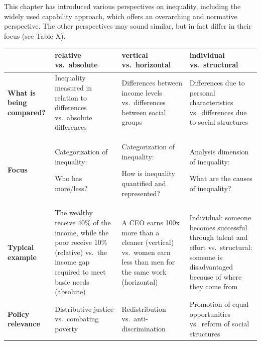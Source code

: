 \documentclass[
  a4paper,
  openany]{book}
\begin{document}
This chapter has introduced various perspectives on inequality,
including the widely used capability approach, which offers an
overarching and normative perspective. The other perspectives may sound
similar, but in fact differ in their focus (see Table X).

\begin{longtable}[]{@{}
  >{\raggedright\arraybackslash}p{}
  >{\raggedright\arraybackslash}p{}
  >{\raggedright\arraybackslash}p{}
  >{\raggedright\arraybackslash}p{}@{}}
\toprule\noalign{}
\begin{minipage}[b]{\linewidth}\raggedright
\end{minipage} & \begin{minipage}[b]{\linewidth}\raggedright
relative vs.~absolute
\end{minipage} & \begin{minipage}[b]{\linewidth}\raggedright
vertical vs.~horizontal
\end{minipage} & \begin{minipage}[b]{\linewidth}\raggedright
individual vs.~structural
\end{minipage} \\
\midrule\noalign{}
\endhead
\bottomrule\noalign{}
\endlastfoot
\textbf{What is being compared?} & Inequality measured in relation to
differences vs.~absolute differences & Differences between income levels
vs.~differences between social groups & Differences due to personal
characteristics vs.~differences due to social structures \\
\textbf{Focus} & Categorization of inequality:

Who has more/less? & Categorization of inequality:

How is inequality quantified and represented? & Analysis dimension of
inequality:

What are the causes of inequality? \\
\textbf{Typical example} & The wealthy receive 40\% of the income, while
the poor receive 10\% (relative) vs.~the income gap required to meet
basic needs (absolute) & A CEO earns 100x more than a cleaner (vertical)
vs.~women earn less than men for the same work (horizontal) &
Individual: someone becomes successful through talent and effort
vs.~structural: someone is disadvantaged because of where they come
from \\
\textbf{Policy relevance} & Distributive justice vs.~combating poverty &
Redistribution vs.~anti-discrimination & Promotion of equal
opportunities vs.~reform of social structures \\
\end{longtable}
\end{document}
